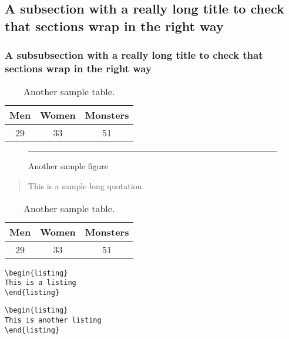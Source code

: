 \documentclass[lscape]{msu-thesis}
\begin{document}
\subsection{A subsection with a really long title to check that sections wrap in the right way}
\subsubsection{A subsubsection with a really long title to check that sections wrap in the right way}
\begin{table}
\centering
\begin{tabular}{ccc}
\toprule
Men & Women & Monsters\\
\midrule
29 & 33 & 51\\
\bottomrule
\end{tabular}
\caption{Another sample table.}
\end{table}
\lipsum[7]
\begin{exe}
\ex\label{2}
\begin{xlist}
\end{xlist}
\end{exe}
\begin{figure}
\centering
{\color{gray!40}\rule{4in}{2in}}
\caption{Another sample figure}
\end{figure}
\lipsum[2]
\begin{quote}
\SingleSpacing
This is a sample long quotation. \lipsum[2]

\hfill{\citep{Munn1999}}
\end{quote}
\begin{table}
\centering
\begin{tabular}{ccc}
\toprule
Men & Women & Monsters\\
\midrule
29 & 33 & 51\\
\bottomrule
\end{tabular}
\caption{Another sample table.}
\end{table}
\begin{listing}
\begin{lstlisting}
\begin{listing}
This is a listing
\end{listing}
\end{lstlisting}
\caption{A listing caption}
\end{listing}
\begin{listing}
\begin{lstlisting}
\begin{listing}
This is another listing
\end{listing}
\end{lstlisting}
\caption{Another listing caption}
\end{listing}
\lipsum[8]
\end{document}
